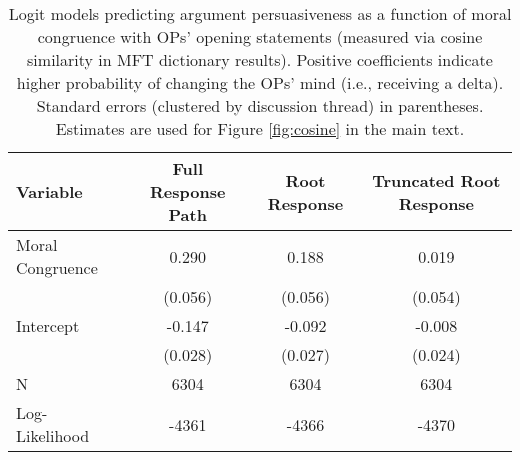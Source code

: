 \begin{table}[ht]
\centering
\caption[Logit models predicting argument persuasiveness as a 
            function of moral congruence with OPs' opening statements]{Logit models predicting argument persuasiveness as a 
            function of moral congruence with OPs' opening statements (measured via cosine similarity in 
            MFT dictionary results). Positive coefficients indicate higher probability of changing the OPs'
            mind (i.e., receiving a delta). 
            Standard errors (clustered by discussion thread) in parentheses. Estimates are used for Figure
            \ref{fig:cosine} in the main text.} 
\label{tab:cosine}
\begingroup\footnotesize
\begin{tabular}{lccc}
  \hline
Variable & Full Response Path & Root Response & Truncated Root Response \\ 
  \hline
Moral Congruence &  0.290 &  0.188 &  0.019 \\ 
   & (0.056) & (0.056) & (0.054) \\ 
  Intercept & -0.147 & -0.092 & -0.008 \\ 
   & (0.028) & (0.027) & (0.024) \\ 
   \hline
N & 6304 & 6304 & 6304 \\ 
  Log-Likelihood & -4361 & -4366 & -4370 \\ 
   \hline
\end{tabular}
\endgroup
\end{table}
